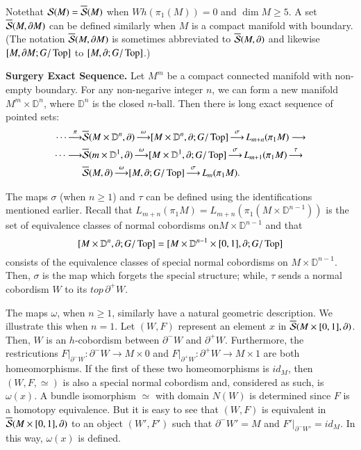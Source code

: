 Note\pageoriginale that $\mathcal{S}(M) = \overline{\mathcal{S}}(M)$ when
$Wh(\pi_1 (M))=0$ and 
$\dim M\geq 5$. A set $\overline{\mathcal{S}}(M, \partial M)$ can be defined
similarly 
when $M$ is a compact manifold with boundary. (The notation
$\overline{\mathcal{S}}(M,\partial M)$ is sometimes abbreviated to
$\overline{\mathcal{S}}(M, \partial)$ and 
likewise $[M, \partial M; G/\operatorname{Top}]$ to $[M, \partial;
  G/\operatorname{Top}]$.) 

\noindent \textbf{Surgery Exact Sequence.} Let $M^m$ be a compact
connected manifold with non-empty boundary. For any non-negarive
integer $n$, we can form a new manifold $M^m \times \mathbb{D}^n$,
where $\mathbb{D}^n$ is the closed $n$-ball. Then there is long exact
sequence of pointed sets:
\begin{align*}
  \cdots \mathop{\longrightarrow}^{\pi} & \overline{\mathcal{S}} (M \times
    \mathbb{D}^n, \partial) \mathop{\longrightarrow}^{\omega} [M \times
      \mathbb{D}^n, \partial; G/\operatorname{Top}]
    \mathop{\longrightarrow}^{\sigma} L_{m+n}(\pi_1 M) \longrightarrow \\
  \cdots \longrightarrow & \overline{\mathcal{S}} (m \times \mathbb{D}^1, \partial)
    \mathop{\longrightarrow}^{\omega} [M \times \mathbb{D}^1,
      \partial; G/\operatorname{Top}] \mathop{\longrightarrow}^{\sigma}
    L_{m+1} (\pi_1 M) \mathop{\longrightarrow}^{\tau} \\
    & \overline{\mathcal{S}}(M,
    \partial)\mathop{\longrightarrow}^{\omega} [M, \partial; G/\operatorname{Top}]
    \mathop{\longrightarrow}^{\sigma} L_m (\pi_1 M).  
\end{align*}

The maps $\sigma$ (when $n \geq 1$) and $\tau$ can be defined using
the identifications mentioned earlier. Recall that $L_{m+n} (\pi_1 M)=
L_{m+ n} (\pi_1 (M \times \mathbb{D}^{n-1}))$ is the set of
equivalence classes of normal cobordisms on$M \times \mathbb{D}^{n-1}$
and that 
$$
[M \times \mathbb{D}^n, \partial; G/\operatorname{Top}] = [M \times
  \mathbb{D}^{n-1} \times [0, 1], \partial; G/\operatorname{Top}]
$$
consists of the equivalence classes of special normal cobordisms on $M
\times \mathbb{D}^{n-1}$. Then, $\sigma$ is the map which forgets the
special structure; while, $\tau$ sends a normal cobordism $W$ to its
$top\, \partial^+ W$.

The maps $\omega$, when $n \geq 1$, similarly have a natural geometric
description. We illustrate this when $n=1$. Let $(W, F)$ represent an
element $x$ in $\overline{\mathcal{S}}(M \times [0, 1], \partial)$. Then, $W$ is an
$h$-cobordism between $\partial^- W$ and $\partial^+ W$. Furthermore,
the restricutions $F|_{\partial^- W}: \partial^- W \to M \times 0$ and
$F|_{\partial^+ W}: \partial^+ W \to M \times 1$ are both
homeomorphisms. If the first of these two homeomorphisms is $id_M$,
then $(W, F, \simeq)$ is also a special normal cobordism and,
considered as such, is $\omega (x)$. A bundle isomorphism $\simeq$
with domain $N (W)$ is determined since $F$ is a homotopy
equivalence. But it is easy to see that $(W, F)$ is equivalent in
$\overline{\mathcal{S}}(M \times [0, 1], \partial)$ to an object $(W', F')$ such that
$\partial^- W'=M$ and $F'|_{\partial^- W'} = id_M$. In this way,
$\omega(x)$ is defined.

